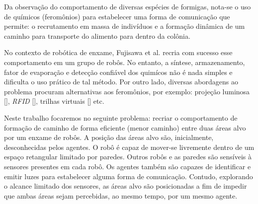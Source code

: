 Da observação do comportamento de diversas espécies de formigas, nota-se o uso de químicos (feromônios) para estabelecer uma forma de comunicação que permite: o recrutamento em massa de indivíduos e a formação dinâmica de um caminho para transporte do alimento para dentro da colônia.

No contexto de robótica de enxame, Fujisawa et al. \cite{fujisawa2008pheromone} recria com sucesso esse comportamento em um grupo de robôs. No entanto, a síntese, armazenamento, fator de evaporação e detecção confiável dos quimícos não é nada simples e dificulta o uso prático de tal método.
Por outro lado, diversas abordagens ao problema procuram alternativas aos feromônios, por exemplo: projeção luminosa [], \textit{RFID} [], trilhas virtuais [] etc.

Neste trabalho focaremos no seguinte problema: recriar o comportamento de formação de caminho de forma eficiente (menor caminho) entre duas áreas alvo por um enxame de robôs. A posição das áreas alvo são, inicialmente, desconhecidas pelos agentes. O robô é capaz de mover-se livremente dentro de um espaço retangular limitado por paredes. Outros robôs e as paredes são sensíveis à sensores presentes em cada robô. Os agentes também são capazes de identificar e emitir luzes para estabelecer alguma forma de comunicação. Contudo, explorando o alcance limitado dos sensores, as áreas alvo são posicionadas a fim de impedir que ambas áreas sejam percebidas, ao mesmo tempo, por um mesmo agente.